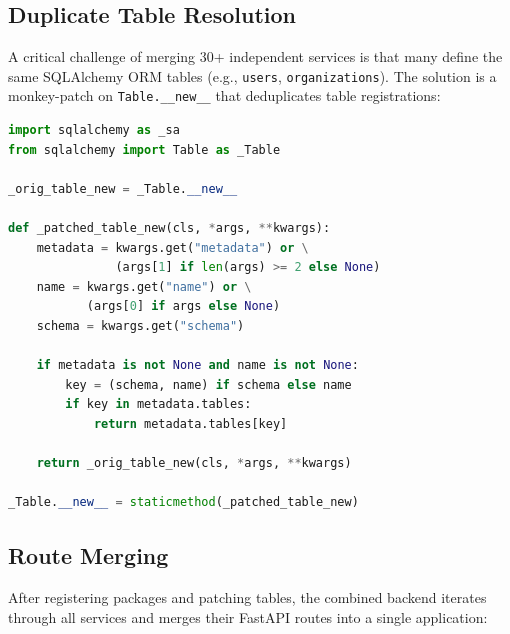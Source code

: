 \documentclass[11pt,a4paper]{article}
\begin{document}
\subsection{Duplicate Table Resolution}

A critical challenge of merging 30+ independent services is that many define the same SQLAlchemy ORM tables (e.g., \texttt{users}, \texttt{organizations}). The solution is a monkey-patch on \texttt{Table.\_\_new\_\_} that deduplicates table registrations:

\begin{lstlisting}[language=Python, caption=SQLAlchemy Table Deduplication]
import sqlalchemy as _sa
from sqlalchemy import Table as _Table

_orig_table_new = _Table.__new__

def _patched_table_new(cls, *args, **kwargs):
    metadata = kwargs.get("metadata") or \
               (args[1] if len(args) >= 2 else None)
    name = kwargs.get("name") or \
           (args[0] if args else None)
    schema = kwargs.get("schema")

    if metadata is not None and name is not None:
        key = (schema, name) if schema else name
        if key in metadata.tables:
            return metadata.tables[key]

    return _orig_table_new(cls, *args, **kwargs)

_Table.__new__ = staticmethod(_patched_table_new)
\end{lstlisting}

\subsection{Route Merging}

After registering packages and patching tables, the combined backend iterates through all services and merges their FastAPI routes into a single application:
\end{document}

